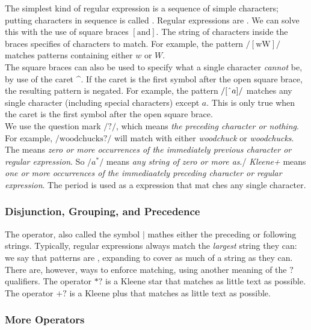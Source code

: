 \documentclass{article}
\begin{document}
The simplest kind of regular expression is a sequence of simple characters; putting characters in sequence is called . Regular expressions are . We can solve this with the use of square braces $[\textrm{and}]$. The string of characters inside the braces specifies  of characters to match. For example, the pattern $/[\textrm{wW}]/$ matches patterns containing either $w$ or $W$. \\ 

The square braces can also be used to specify what a single character \emph{cannot} be, by use of the caret \^{}. If the caret is the first symbol after the open square brace, the resulting pattern is negated. For example, the pattern $/[ \textrm{\^{}} a]/$ matches any single character (including special characters) except $a$. This is only true when the caret is the first symbol after the open square brace. \\ 

We use the question mark $/?/$, which means \emph{the preceding character or nothing}. For example, $/\textrm{woodchucks?}/$ will match with either \emph{woodchuck} or \emph{woodchucks}. The  means \emph{zero or more occurrences of the immediately previous character or regular expression}. So $/a^{*}/$ means \emph{any string of zero or more as}./ \emph{Kleene+} means \emph{one or more occurrences of the immediaately preceding character or regular expression}. The period is used as a  expression that mat ches any single character. 

\subsubsection{Disjunction, Grouping, and Precedence}

The  operator, also called the  symbol $\vert$ mathes either the preceding or following strings. Typically, regular expressions always match the \emph{largest} string they can: we say that patterns are , expanding to cover as much of a string as they can. There are, however, ways to enforce  matching, using another meaning of the $?$ qualifiers. The operator $*?$ is a Kleene star that matches as little text as possible. The operator $+?$ is a Kleene plus that matches as little text as possible. 

\subsubsection{More Operators}
\end{document}
